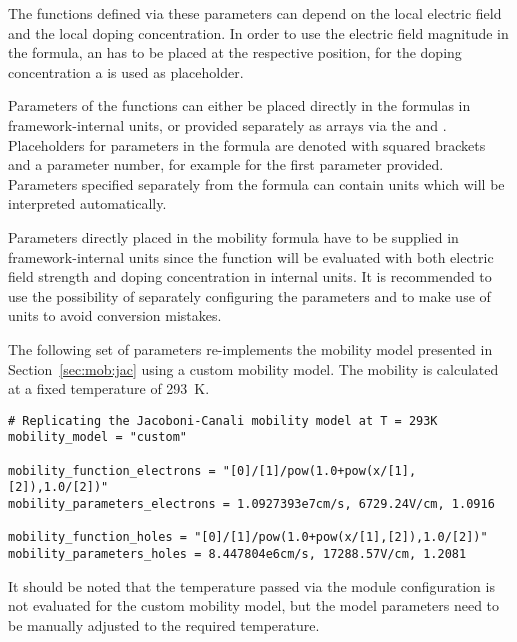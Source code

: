 The functions defined via these parameters can depend on the local electric field and the local doping concentration.
In order to use the electric field magnitude in the formula, an  has to be placed at the respective position, for the doping concentration a  is used as placeholder.

Parameters of the functions can either be placed directly in the formulas in framework-internal units, or provided separately as arrays via the  and .
Placeholders for parameters in the formula are denoted with squared brackets and a parameter number, for example \parameter{[0]} for the first parameter provided.
Parameters specified separately from the formula can contain units which will be interpreted automatically.

\begin{warning}
Parameters directly placed in the mobility formula have to be supplied in framework-internal units since the function will be evaluated with both electric field strength and doping concentration in internal units.
It is recommended to use the possibility of separately configuring the parameters and to make use of units to avoid conversion mistakes.
\end{warning}

The following set of parameters re-implements the mobility model presented in Section~\ref{sec:mob:jac} using a custom mobility model.
The mobility is calculated at a fixed temperature of \SI{293}{K}.
\begin{verbatim}
# Replicating the Jacoboni-Canali mobility model at T = 293K
mobility_model = "custom"

mobility_function_electrons = "[0]/[1]/pow(1.0+pow(x/[1],[2]),1.0/[2])"
mobility_parameters_electrons = 1.0927393e7cm/s, 6729.24V/cm, 1.0916

mobility_function_holes = "[0]/[1]/pow(1.0+pow(x/[1],[2]),1.0/[2])"
mobility_parameters_holes = 8.447804e6cm/s, 17288.57V/cm, 1.2081
\end{verbatim}

\begin{warning}
It should be noted that the temperature passed via the module configuration is not evaluated for the custom mobility model, but the model parameters need to be manually adjusted to the required temperature.
\end{warning}

